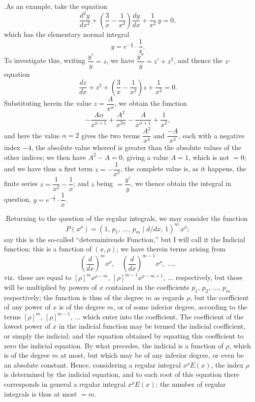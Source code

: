 \documentclass[11pt]{article}
\begin{document}
\medskip

.\quad As an example, take the equation
\[
\frac{d^2y}{dx^2} + \left(\frac{3}{x} - \frac{1}{x^2}\right)\frac{dy}{dx} + \frac{1}{x^2}\,y = 0,
\]
which has the elementary normal integral
\[
y = e^{-\frac{1}{x}}\cdot\frac{1}{x}.
\]
To investigate this, writing $\dfrac{y'}{y} = z$, we have $\dfrac{y''}{y} = z' + z^2$, and thence the $z$-equation
\[
\frac{dz}{dx} + z^2 + \left(\frac{3}{x} - \frac{1}{x^2}\right)z + \frac{1}{x^2} = 0.
\]
Substituting herein the value $z = \dfrac{A}{x^{\alpha}}$, we obtain the function
\[
-\frac{A\alpha}{x^{\alpha+1}} + \frac{A^2}{x^{2\alpha}} - \frac{A}{x^{\alpha+1}} + \frac{1}{x^2},
\]
and here the value $\alpha=2$ gives the two terms $\dfrac{A^2}{x^4}$ and $\dfrac{-A}{x^4}$, each with a negative index $-4$, the absolute value whereof is greater than the absolute values of the other indices; we then have $A^2-A=0$, giving a value $A=1$, which is not $=0$; and we have thus a first term $z = -\dfrac{1}{x^2}$, the complete value is, as it happens, the finite series $z = \dfrac{1}{x^2} - \dfrac{1}{x}$; and $z$ being $=\dfrac{y'}{y}$, we thence obtain the integral in question, $y = e^{-\frac{1}{x}}\cdot\dfrac{1}{x}$.

\medskip

.\quad Returning to the question of the regular integrals, we may consider the function
\[
P(x^{\rho}) = (1,\,p_1,\,\dotsc,\,p_m\mid d/dx,\,1)^m\,x^{\rho};
\]
say this is the so-called ``determinirende Function,'' but I will call it the Indicial function; this is a function of $(x,\rho)$; we have therein terms arising from
\[
\left(\frac{d}{dx}\right)^{\!m}\!x^{\rho},\quad \left(\frac{d}{dx}\right)^{\!m-1}\!x^{\rho},\;\dotsc,
\]
viz.\ these are equal to $[\rho]^m x^{\rho-m}$, $[\rho]^{m-1} x^{\rho-m+1}$, $\dotsc$ respectively, but these will be multiplied by powers of $x$ contained in the coefficients $p_1$, $p_2$, $\dotsc$, $p_m$ respectively; the function is thus of the degree $m$ as regards $\rho$, but the coefficient of any power of $x$ is of the degree $m$, or of some inferior degree, according to the terms $[\rho]^m$, $[\rho]^{m-1}$, $\dotsc$ which enter into the coefficient. The coefficient of the lowest power of $x$ in the indicial function may be termed the indicial coefficient, or simply the indicial; and the equation obtained by equating this coefficient to zero the indicial equation. By what precedes, the indicial is a function of $\rho$, which is of the degree $m$ at most, but which may be of any inferior degree, or even be an absolute constant. Hence, considering a regular integral $x^{\rho}E(x)$, the index $\rho$ is determined by the indicial equation, and to each root of this equation there corresponds in general a regular integral $x^{\rho}E(x)$; the number of regular integrals is thus at most $=m$.
\end{document}
